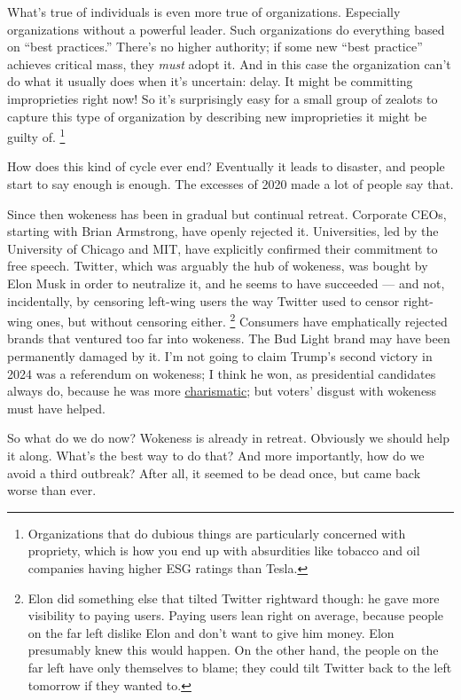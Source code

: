 \documentclass[12pt]{book}
\begin{document}
What's true of individuals is even more true of organizations.
Especially organizations without a powerful leader. Such organizations
do everything based on ``best practices.'' There's no higher authority;
if some new ``best practice'' achieves critical mass, they \emph{must}
adopt it. And in this case the organization can't do what it usually
does when it's uncertain: delay. It might be committing improprieties
right now! So it's surprisingly easy for a small group of zealots to
capture this type of organization by describing new improprieties it
might be guilty of. \footnote{Organizations that do dubious things are particularly concerned
with propriety, which is how you end up with absurdities like tobacco
and oil companies having higher ESG ratings than Tesla.}

How does this kind of cycle ever end? Eventually it leads to disaster,
and people start to say enough is enough. The excesses of 2020 made a
lot of people say that.

Since then wokeness has been in gradual but continual retreat. Corporate
CEOs, starting with Brian Armstrong, have openly rejected it.
Universities, led by the University of Chicago and MIT, have explicitly
confirmed their commitment to free speech. Twitter, which was arguably
the hub of wokeness, was bought by Elon Musk in order to neutralize it,
and he seems to have succeeded --- and not, incidentally, by censoring
left-wing users the way Twitter used to censor right-wing ones, but
without censoring either. \footnote{Elon did something else that tilted Twitter rightward though:
he gave more visibility to paying users. Paying users lean right on
average, because people on the far left dislike Elon and don't want to
give him money. Elon presumably knew this would happen. On the other
hand, the people on the far left have only themselves to blame; they
could tilt Twitter back to the left tomorrow if they wanted to.} Consumers have
emphatically rejected brands that ventured too far into wokeness. The
Bud Light brand may have been permanently damaged by it. I'm not going
to claim Trump's second victory in 2024 was a referendum on wokeness; I
think he won, as presidential candidates always do, because he was more
\href{charisma.html}{charismatic}; but voters' disgust with wokeness
must have helped.

So what do we do now? Wokeness is already in retreat. Obviously we
should help it along. What's the best way to do that? And more
importantly, how do we avoid a third outbreak? After all, it seemed to
be dead once, but came back worse than ever.
\end{document}
